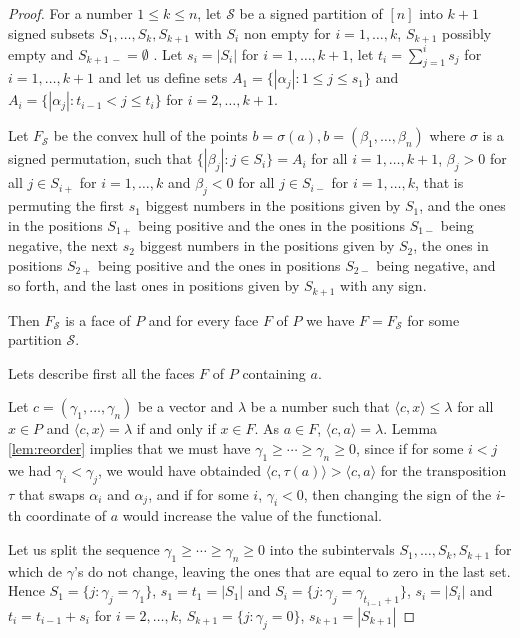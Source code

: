 \documentclass[12pt]{amsart}
\numberwithin{equation}{section}
\begin{document}
\begin{proof}
For a number $1\leq k\leq n$, let $\mathcal S$ be a signed partition of $[n]$ into $k+1$ signed subsets $S_1, \dots, S_k, S_{k+1}$ with $S_i$ non empty for $i=1,\dots,k$, $S_{k+1}$ possibly empty and $S_{k+1\, -}=\emptyset$ . Let $s_i=|S_i|$ for $i=1,\dots,k+1$,  let $t_i=\sum_{j=1}^i s_j$ for $i=1,\dots,k+1$ and let us define sets $A_1=\{|\alpha_j|: 1\leq j\leq s_1\}$ and $A_i=\{|\alpha_j|: t_{i-1}<j\leq t_i\}$ for $i=2,\dots,k+1$.

Let $F_{\mathcal S}$ be the convex hull of the points $b=\sigma(a), b=(\beta_1,\dots,\beta_n)$ where $\sigma $ is a signed permutation, such that $\{ |\beta_j|:j\in S_i \}=A_i $ for all $i=1,\dots,k+1$, $ \beta_j>0 $ for all $j\in S_{i+}$ for $i=1,\dots,k$ and $ \beta_j<0 $ for all $j\in S_{i-}$ for $i=1,\dots,k$, that is permuting the first $s_1$ biggest numbers in the positions given by $S_1$, and the ones in the positions $S_{1+}$ being positive and the ones in the positions $S_{1-}$ being negative, the next $s_2$ biggest numbers in the positions given by $S_2$, the ones in positions $S_{2+}$ being positive and the ones in positions $S_{2-}$ being negative, and so forth, and the last ones in positions given by $S_{k+1}$ with any sign.

Then $F_{\mathcal S}$ is a face of $P$ and for every face $F$ of $P$ we have $F=F_{\mathcal S}$ for some partition $\mathcal S$.

Lets describe first all the faces $F$ of $P$ containing $a$.

Let $c=(\gamma_1,\dots,\gamma_n)$ be a vector and $\lambda$ be a number such that $\langle c, x \rangle \leq \lambda$ for all $x\in P$ and $\langle c, x \rangle = \lambda$ if and only if $x\in F$. As $a\in F$, $\langle c, a \rangle = \lambda$. Lemma \ref{lem:reorder} implies that we must have $\gamma_1\geq\cdots\geq\gamma_n\geq 0$, since if for some $i<j$ we had $\gamma_i<\gamma_j$, we would have obtainded $\langle c, \tau(a) \rangle > \langle c, a \rangle$ for the transposition $\tau$ that swaps $\alpha_i$ and $\alpha_j$, and if for some $i$, $\gamma_i<0$, then changing the sign of the $i$-th coordinate of $a$ would increase the value of the functional.

Let us split the sequence $\gamma_1\geq\cdots\geq\gamma_n\geq 0$ into the subintervals $S_1,\dots,S_k,S_{k+1}$ for which de $\gamma$'s do not change, leaving the ones that are equal to zero in the last set. Hence $S_1=\{ j:\gamma_j=\gamma_1 \}$, $s_1=t_1=|S_1|$ and $S_i=\{ j:\gamma_j=\gamma_{t_{i-1}+1} \}$, $s_i=|S_i|$ and $t_i=t_{i-1}+s_i$ for $i=2,\dots,k$, $S_{k+1}=\{ j:\gamma_j=0 \}$, $s_{k+1}=|S_{k+1}|$


\end{proof}
\end{document}
